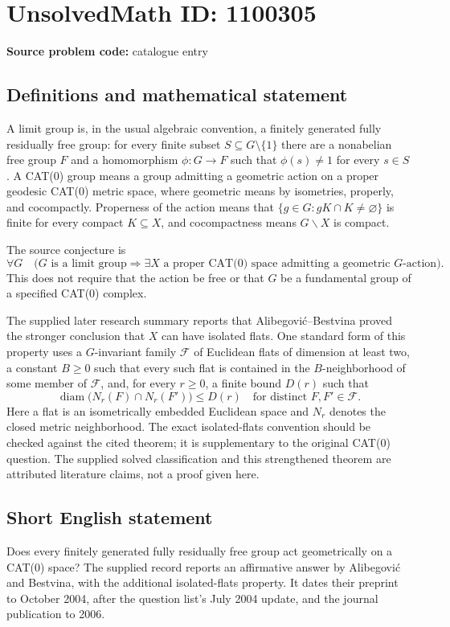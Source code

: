 \documentclass[11pt]{article}
\begin{document}
\section*{UnsolvedMath ID: 1100305}
\textbf{Source problem code:} catalogue entry
\subsection{Definitions and mathematical statement}
A limit group is, in the usual algebraic convention, a finitely generated fully residually free group: for every finite subset $S\subseteq G\setminus\{1\}$ there are a nonabelian free group $F$ and a homomorphism $\phi:G\to F$ such that $\phi(s)\ne1$ for every $s\in S$. A CAT(0) group means a group admitting a geometric action on a proper geodesic CAT(0) metric space, where geometric means by isometries, properly, and cocompactly. Properness of the action means that $\{g\in G:gK\cap K\ne\varnothing\}$ is finite for every compact $K\subseteq X$, and cocompactness means $G\backslash X$ is compact.

The source conjecture is
\[
\forall G\quad\bigl(G\text{ is a limit group}\Longrightarrow
\exists X\text{ a proper CAT(0) space admitting a geometric }G\text{-action}\bigr).
\]
This does not require that the action be free or that $G$ be a fundamental group of a specified CAT(0) complex.

The supplied later research summary reports that Alibegovi\'c--Bestvina proved the stronger conclusion that $X$ can have isolated flats. One standard form of this property uses a $G$-invariant family $\mathcal F$ of Euclidean flats of dimension at least two, a constant $B\ge0$ such that every such flat is contained in the $B$-neighborhood of some member of $\mathcal F$, and, for every $r\ge0$, a finite bound $D(r)$ such that
\[
\operatorname{diam}\bigl(N_r(F)\cap N_r(F')\bigr)\le D(r)
\quad\text{for distinct }F,F'\in\mathcal F.
\]
Here a flat is an isometrically embedded Euclidean space and $N_r$ denotes the closed metric neighborhood. The exact isolated-flats convention should be checked against the cited theorem; it is supplementary to the original CAT(0) question. The supplied solved classification and this strengthened theorem are attributed literature claims, not a proof given here.
\subsection{Short English statement}
Does every finitely generated fully residually free group act geometrically on a CAT(0) space? The supplied record reports an affirmative answer by Alibegovi\'c and Bestvina, with the additional isolated-flats property. It dates their preprint to October 2004, after the question list's July 2004 update, and the journal publication to 2006.
\end{document}
